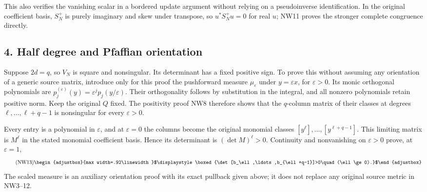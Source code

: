 \documentclass[11pt]{article}
\begin{document}
This also verifies the vanishing scalar in a bordered update argument without relying on a pseudoinverse identification. In the original coefficient basis, \(S_N^+\) is purely imaginary and skew under transpose, so \(u^*S_N^+u=0\) for real \(u\); NW11 proves the stronger complete congruence directly.

\subsection{4. Half degree and Pfaffian orientation}\label{part4-half-degree-and-pfaffian-orientation}

Suppose \(2d=q\), so \(V_N\) is square and nonsingular. Its determinant has a fixed positive sign. To prove this without assuming any orientation of a generic source matrix, introduce only for this proof the pushforward measure \(\mu_\varepsilon\) under \(y=\varepsilon x\), for \(\varepsilon>0\). Its monic orthogonal polynomials are \(p_j^{(\varepsilon)}(y)=\varepsilon^jp_j(y/\varepsilon)\). Their orthogonality follows by substitution in the integral, and all nonzero polynomials retain positive norm. Keep the original \(Q\) fixed. The positivity proof NW8 therefore shows that the \(q\)-column matrix of their classes at degrees \(\ell,\ldots,\ell+q-1\) is nonsingular for every \(\varepsilon>0\).

Every entry is a polynomial in \(\varepsilon\), and at \(\varepsilon=0\) the columns become the original monomial classes \([y^\ell],\ldots,[y^{\ell+q-1}]\). This limiting matrix is \(M^\ell\) in the stated monomial coefficient basis. Hence its determinant is \((\det M)^\ell>0\). Continuity and nonvanishing on \(\varepsilon>0\) prove, at \(\varepsilon=1\), 
\begin{equation*}
\tag{NW13}
\begin{adjustbox}{max width=.92\linewidth}$\displaystyle \boxed{\det[b_\ell,\ldots,b_{\ell+q-1}]>0\quad(\ell\ge0).}$\end{adjustbox}
\end{equation*}
 The scaled measure is an auxiliary orientation proof with its exact pullback given above; it does not replace any original source metric in NW3--12.
\end{document}
